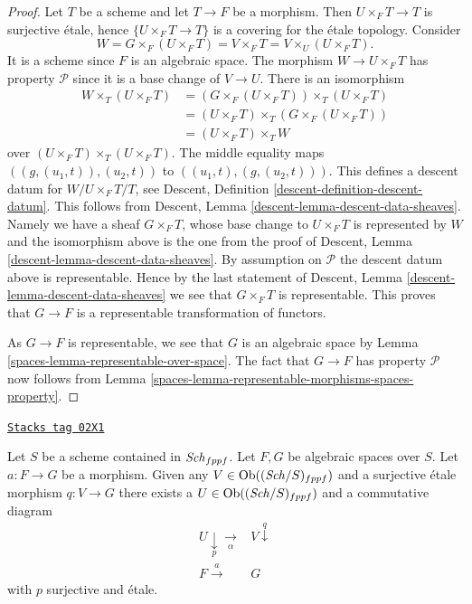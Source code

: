 \begin{proof}

Let $T$ be a scheme and let $T \to F$ be a morphism. Then
$U \times_F T \to T$ is surjective \'etale, hence $\{U \times_F T \to T\}$ is
a covering for the \'etale topology. Consider
$$
W = G \times_F (U \times_F T) = V \times_F T = V \times_U (U \times_F T).
$$
It is a scheme since $F$ is an algebraic space. The morphism
$W \to U \times_F T$ has property $\mathcal{P}$ since it is a
base change of $V \to U$. There is an isomorphism
\begin{align*}
W \times_T (U \times_F T) & =
(G \times_F (U \times_F T)) \times_T (U \times_F T) \\
& = (U \times_F T) \times_T (G \times_F (U \times_F T)) \\
& = (U \times_F T) \times_T W
\end{align*}
over $(U \times_F T) \times_T (U \times_F T)$. The middle equality maps
$((g, (u_1, t)), (u_2, t))$ to $((u_1, t), (g, (u_2, t)))$.
This defines a descent datum for $W/U \times_F T/T$, see
Descent, Definition \ref{descent-definition-descent-datum}.
This follows from
Descent, Lemma \ref{descent-lemma-descent-data-sheaves}.
Namely we have a sheaf $G \times_F T$, whose
base change to $U \times_F T$ is represented by $W$ and the isomorphism
above is the one from the proof of
Descent, Lemma \ref{descent-lemma-descent-data-sheaves}.
By assumption on $\mathcal{P}$ the descent datum above is representable.
Hence by the last statement of
Descent, Lemma \ref{descent-lemma-descent-data-sheaves}
we see that $G \times_F T$ is representable. This proves that
$G \to F$ is a representable transformation of functors.

\medskip\noindent
As $G \to F$ is representable, we see that $G$ is an algebraic space by
Lemma \ref{spaces-lemma-representable-over-space}. The fact that $G \to F$ has
property $\mathcal{P}$ now follows from
Lemma \ref{spaces-lemma-representable-morphisms-spaces-property}.
\end{proof}

\begin{lemma}
\label{spaces-lemma-lift-morphism-presentations}
\href{https://stacks.math.columbia.edu/tag/02X1}{\texttt{Stacks tag 02X1}}

Let $S$ be a scheme contained in $\mathit{Sch}_{fppf}$.
Let $F, G$ be algebraic spaces over $S$.
Let $a : F \to G$ be a morphism.
Given any $V \in \operatorname{Ob}((\mathit{Sch}/S)_{fppf})$
and a surjective \'etale morphism $q : V \to G$ there exists
a $U \in \operatorname{Ob}((\mathit{Sch}/S)_{fppf})$
and a commutative diagram
$$
\begin{array}{cc}U \underset{p}{\downarrow}\underset{\alpha}{\longrightarrow} & V \overset{q}{\downarrow} \\ F \overset{a}{\longrightarrow} & G\end{array}
$$
with $p$ surjective and \'etale.
\end{lemma}

